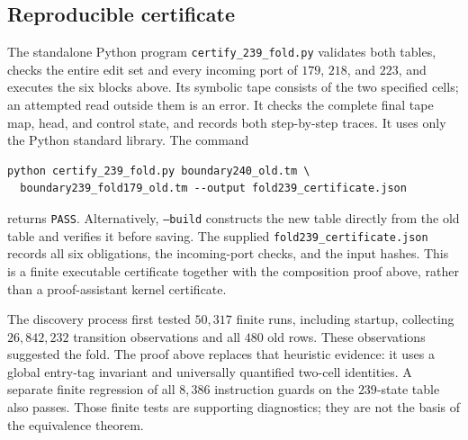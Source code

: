 \subsection{Reproducible certificate}

The standalone Python program \texttt{certify\_239\_fold.py} validates
both tables, checks the entire edit set and every incoming port of
$179$, $218$, and $223$, and executes the six blocks above.  Its
symbolic tape consists of the two specified cells; an attempted
read outside them is an error.  It checks the complete final tape
map, head, and control state, and records both step-by-step traces.
It uses only the Python standard library.  The command
\begin{verbatim}
python certify_239_fold.py boundary240_old.tm \
  boundary239_fold179_old.tm --output fold239_certificate.json
\end{verbatim}
returns \texttt{PASS}.  Alternatively, \texttt{--build} constructs the
new table directly from the old table and verifies it before saving.
The supplied \texttt{fold239\_certificate.json} records all six
obligations, the incoming-port checks, and the input hashes.  This
is a finite executable certificate together with the composition
proof above, rather than a proof-assistant kernel certificate.

The discovery process first tested $50,317$ finite runs, including
startup, collecting $26,842,232$ transition observations and all
$480$ old rows.  These observations suggested the fold.  The proof
above replaces that heuristic evidence: it uses a global entry-tag
invariant and universally quantified two-cell identities.  A separate
finite regression of all $8,386$ instruction guards on the $239$-state
table also passes.  Those finite tests are supporting diagnostics;
they are not the basis of the equivalence theorem.
